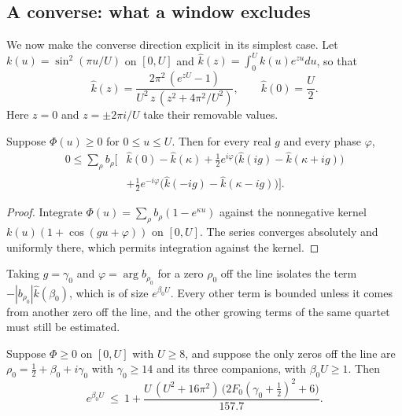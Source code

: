 \subsection{A converse: what a window excludes}
We now make the converse direction explicit in its simplest case. Let $k(u)=\sin^2(\pi u/U)$ on $[0,U]$ and $\hat k(z)=\int_0^Uk(u)e^{zu}du$, so that
\[
\hat k(z)=\frac{2\pi^2\,(e^{zU}-1)}{U^2\,z\,(z^2+4\pi^2/U^2)},\qquad\hat k(0)=\frac U2 .
\]
Here $z=0$ and $z=\pm2\pi i/U$ take their removable values.
\begin{lemma}\label{st:lem:kernel}
Suppose $\Phi(u)\ge0$ for $0\le u\le U$. Then for every real $g$ and every phase $\varphi$,
\begin{align*}
0\le\sum_\rho b_\rho\Big[&\hat k(0)-\hat k(\kappa)+\tfrac12e^{i\varphi}\big(\hat k(ig)-\hat k(\kappa+ig)\big)\\
&+\tfrac12e^{-i\varphi}\big(\hat k(-ig)-\hat k(\kappa-ig)\big)\Big].
\end{align*}
\end{lemma}
\begin{proof}
Integrate $\Phi(u)=\sum_\rho b_\rho(1-e^{\kappa u})$ against the nonnegative kernel $k(u)(1+\cos(gu+\varphi))$ on $[0,U]$. The series converges absolutely and uniformly there, which permits integration against the kernel.
\end{proof}
Taking $g=\gamma_0$ and $\varphi=\arg b_{\rho_0}$ for a zero $\rho_0$ off the line isolates the term $-|b_{\rho_0}|\hat k(\beta_0)$, which is of size $e^{\beta_0U}$. Every other term is bounded unless it comes from another zero off the line, and the other growing terms of the same quartet must still be estimated.
\begin{proposition}\label{st:prop:isolated}
Suppose $\Phi\ge0$ on $[0,U]$ with $U\ge8$, and suppose the only zeros off the line are $\rho_0=\tfrac12+\beta_0+i\gamma_0$ with $\gamma_0\ge14$ and its three companions, with $\beta_0U\ge1$. Then
\[
e^{\beta_0U}\ \le\ 1+\frac{U\,(U^2+16\pi^2)\,\big(2F_0(\gamma_0+\tfrac12)^2+6\big)}{157.7}.
\]
\end{proposition}
